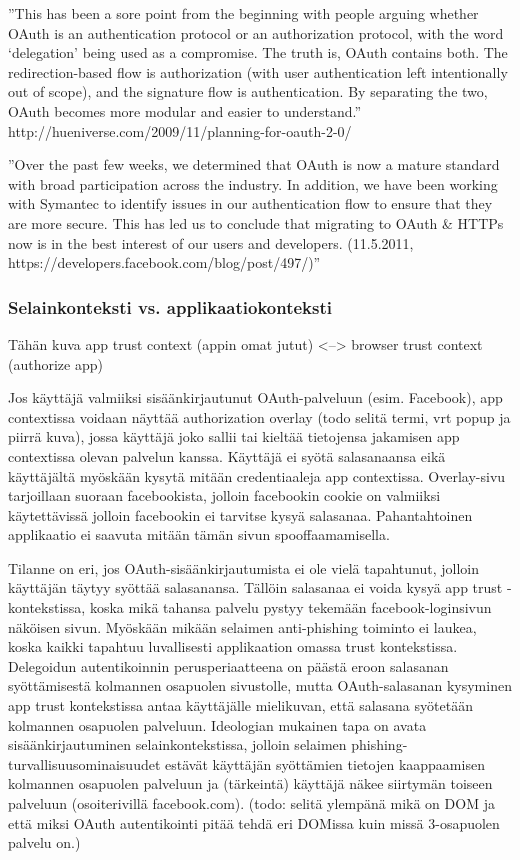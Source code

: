 \documentclass[english,gradu]{tktltiki}
\begin{document}
  ''This has been a sore point from the beginning with people arguing whether OAuth is an authentication protocol or an authorization protocol, with the word ‘delegation’ being used as a compromise. The truth is, OAuth contains both. The redirection-based flow is authorization (with user authentication left intentionally out of scope), and the signature flow is authentication. By separating the two, OAuth becomes more modular and easier to understand.'' http://hueniverse.com/2009/11/planning-for-oauth-2-0/

  ''Over the past few weeks, we determined that OAuth is now a mature standard with broad participation across the industry. In addition, we have been working with Symantec to identify issues in our authentication flow to ensure that they are more secure. This has led us to conclude that migrating to OAuth & HTTPs now is in the best interest of our users and developers. (11.5.2011, https://developers.facebook.com/blog/post/497/)''


  \subsubsection{Selainkonteksti vs. applikaatiokonteksti} %
  \label{ssub:selainkonteksti_vs_applikaatiokonteksti}
  Tähän kuva app trust context (appin omat jutut) <--> browser trust context (authorize app)

  Jos käyttäjä valmiiksi sisäänkirjautunut OAuth-palveluun (esim. Facebook), app contextissa voidaan näyttää authorization overlay (todo selitä termi, vrt popup ja piirrä kuva), jossa käyttäjä joko sallii tai kieltää tietojensa jakamisen app contextissa olevan palvelun kanssa. Käyttäjä ei syötä salasanaansa eikä käyttäjältä myöskään kysytä mitään credentiaaleja app contextissa. Overlay-sivu tarjoillaan suoraan facebookista, jolloin facebookin cookie on valmiiksi käytettävissä jolloin facebookin ei tarvitse kysyä salasanaa. Pahantahtoinen applikaatio ei saavuta mitään tämän sivun spooffaamamisella.

  Tilanne on eri, jos OAuth-sisäänkirjautumista ei ole vielä tapahtunut, jolloin käyttäjän täytyy syöttää salasanansa. Tällöin salasanaa ei voida kysyä app trust -kontekstissa, koska mikä tahansa palvelu pystyy tekemään facebook-loginsivun näköisen sivun. Myöskään mikään selaimen anti-phishing toiminto ei laukea, koska kaikki tapahtuu luvallisesti applikaation omassa trust kontekstissa. Delegoidun autentikoinnin perusperiaatteena on päästä eroon salasanan syöttämisestä kolmannen osapuolen sivustolle, mutta OAuth-salasanan kysyminen app trust kontekstissa antaa käyttäjälle mielikuvan, että salasana syötetään kolmannen osapuolen palveluun. Ideologian mukainen tapa on avata sisäänkirjautuminen selainkontekstissa, jolloin selaimen phishing-turvallisuusominaisuudet estävät käyttäjän syöttämien tietojen kaappaamisen kolmannen osapuolen palveluun ja (tärkeintä) käyttäjä näkee siirtymän toiseen palveluun (osoiterivillä facebook.com). (todo: selitä ylempänä mikä on DOM ja että miksi OAuth autentikointi pitää tehdä eri DOMissa kuin missä 3-osapuolen palvelu on.)
\end{document}
